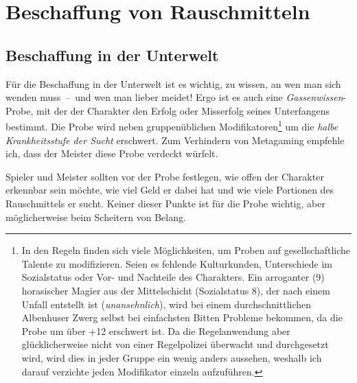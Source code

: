 \section{Beschaffung von Rauschmitteln}
\subsection{Beschaffung in der Unterwelt\label{beschaffung-unterwelt}}
Für die Beschaffung in der Unterwelt ist es wichtig, zu wissen, an wen man sich wenden muss~--~und wen man lieber meidet! Ergo ist es auch eine \emph{Gassenwissen}-Probe, mit der der Charakter den Erfolg oder Misserfolg seines Unterfangens bestimmt. Die Probe wird neben gruppenüblichen Modifikatoren\footnote{In den Regeln finden sich viele Möglichkeiten, um Proben auf gesellschaftliche Talente zu modifizieren. Seien es fehlende Kulturkunden, Unterschiede im Sozialstatus \cite[S.~276]{WdH} oder Vor- und Nachteile \cite[S.~246~ff.]{WdH} des Charakters. Ein arroganter (9) horasischer Magier aus der Mittelschicht (Sozialstatus 8), der nach einem Unfall entstellt ist (\emph{unansehnlich}), wird bei einem durchschnittlichen Albenhuser Zwerg selbst bei einfachsten Bitten Probleme bekommen, da die Probe um über +12 erschwert ist. Da die Regelanwendung aber glücklicherweise nicht von einer Regelpolizei überwacht und durchgesetzt wird, wird dies in jeder Gruppe ein wenig anders aussehen, weshalb ich darauf verzichte jeden Modifikator einzeln aufzuführen.} um die \emph{halbe Krankheitsstufe der Sucht} erschwert. Zum Verhindern von Metagaming empfehle ich, dass der Meister diese Probe verdeckt würfelt.

Spieler und Meister sollten vor der Probe festlegen, wie offen der Charakter erkennbar sein möchte, wie viel Geld er dabei hat und wie viele Portionen des Rauschmittels er sucht. Keiner dieser Punkte ist für die Probe wichtig, aber möglicherweise beim Scheitern von Belang.

